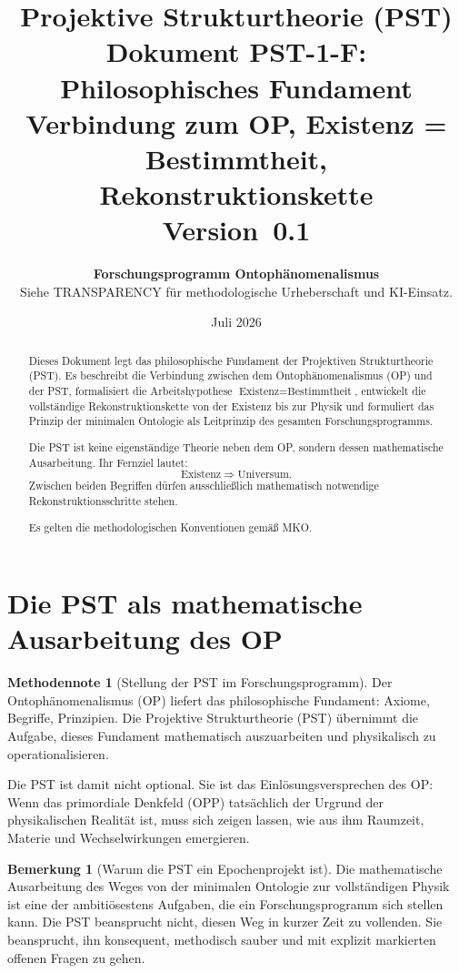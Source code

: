 \documentclass[11pt,a4paper]{article}
\title{
  \textbf{Projektive Strukturtheorie (PST)}\\[0.4em]
  \textbf{Dokument PST-1-F: Philosophisches Fundament}\\[0.4em]
  {\large Verbindung zum OP, Existenz = Bestimmtheit,
  Rekonstruktionskette}\\[0.5em]
  {\normalsize Version~0.1}
}
\author{
  \textbf{Forschungsprogramm Ontoph\"{a}nomenalismus}\\
  \small Siehe TRANSPARENCY f\"{u}r methodologische Urheberschaft
  und KI-Einsatz.
}
\date{Juli 2026}
\theoremstyle{plain}
\theoremstyle{definition}
\newtheorem{remark}{Bemerkung}[section]
\newtheorem{methodennote}{Methodennote}[section]
\begin{document}
\maketitle

\begin{abstract}
Dieses Dokument legt das philosophische Fundament der Projektiven
Strukturtheorie (PST). Es beschreibt die Verbindung zwischen dem
Ontoph\"{a}nomenalismus (OP) und der PST, formalisiert die Arbeitshypothese
\(\text{Existenz} = \text{Bestimmtheit}\), entwickelt die vollst\"{a}ndige
Rekonstruktionskette von der Existenz bis zur Physik und formuliert das
Prinzip der minimalen Ontologie als Leitprinzip des gesamten
Forschungsprogramms.

Die PST ist keine eigenst\"{a}ndige Theorie neben dem OP, sondern dessen
mathematische Ausarbeitung. Ihr Fernziel lautet:
\[
  \boxed{\text{Existenz} \;\Longrightarrow\; \text{Universum.}}
\]
Zwischen beiden Begriffen d\"{u}rfen ausschlie\ss{}lich mathematisch
notwendige Rekonstruktionsschritte stehen.

Es gelten die methodologischen Konventionen gem\"{a}\ss{} MKO.
\end{abstract}

\tableofcontents
\newpage

\section{Die PST als mathematische Ausarbeitung des OP}

\begin{methodennote}[Stellung der PST im Forschungsprogramm]
Der Ontoph\"{a}nomenalismus (OP) liefert das philosophische Fundament:
Axiome, Begriffe, Prinzipien. Die Projektive Strukturtheorie (PST) \"{u}bernimmt
die Aufgabe, dieses Fundament mathematisch auszuarbeiten und physikalisch
zu operationalisieren.

Die PST ist damit nicht optional. Sie ist das Einl\"{o}sungsversprechen
des OP: Wenn das primordiale Denkfeld (OPP) tats\"{a}chlich der Urgrund der
physikalischen Realit\"{a}t ist, muss sich zeigen lassen, wie aus ihm
Raumzeit, Materie und Wechselwirkungen emergieren.
\end{methodennote}

\begin{remark}[Warum die PST ein Epochenprojekt ist]
Die mathematische Ausarbeitung des Weges von der minimalen Ontologie zur
vollst\"{a}ndigen Physik ist eine der ambiti\"{o}sestens Aufgaben, die ein
Forschungsprogramm sich stellen kann. Die PST beansprucht nicht, diesen
Weg in kurzer Zeit zu vollenden. Sie beansprucht, ihn konsequent,
methodisch sauber und mit explizit markierten offenen Fragen zu gehen.
\end{remark}
\end{document}
